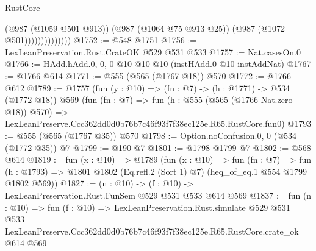 \begin{lexlean}{RustCore}
\begin{coremodule}
                            (@987 (@1059 @501 @913))
                            (@987 (@1064 @75 @913 @25))
                            (@987 (@1072 @501))))))))))))))
@1752 := @548 @1751
@1756 := LexLeanPreservation.Rust.CrateOK @529 @531 @533
@1757 := Nat.casesOn.{0}
@1766 := HAdd.hAdd.{0, 0, 0} @10 @10 @10 (instHAdd.{0} @10 instAddNat)
@1767 := @1766 @614
@1771 := @555 (@565 (@1767 @18)) @570
@1772 := @1766 @612
@1789 := @1757
    (fun (y : @10) => (fn : @7) -> (h : @1771) -> @534 (@1772 @18))
    @569
    (fun (fn : @7) =>
    fun (h : @555 (@565 (@1766 Nat.zero @18)) @570) =>
    LexLeanPreserve.Ccc362dd0d0b76b7c46f93f7f38ec125e.R65.RustCore.fun0)
@1793 := @555 (@565 (@1767 @35)) @570
@1798 := Option.noConfusion.{0, 0} (@534 (@1772 @35)) @7
@1799 := @190 @7
@1801 := @1798 @1799 @7
@1802 := @568 @614
@1819 := fun (x : @10) =>
  @1789
    (fun (x : @10) =>
    fun (fn : @7) =>
    fun (h : @1793) => @1801 @1802 (Eq.refl.{2} (Sort 1) @7) (heq_of_eq.{1} @554 @1799 @1802 @569))
@1827 := (n : @10) -> (f : @10) -> LexLeanPreservation.Rust.FunSem @529 @531 @533 @614 @569
@1837 := fun (n : @10) =>
  fun (f : @10) =>
  LexLeanPreservation.Rust.simulate
    @529
    @531
    @533
    LexLeanPreserve.Ccc362dd0d0b76b7c46f93f7f38ec125e.R65.RustCore.crate_ok
    @614
    @569
\end{coremodule}
\end{lexlean}
